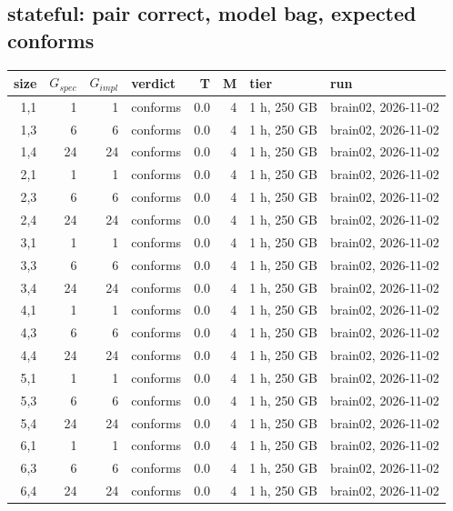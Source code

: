 \documentclass[10pt]{article}
\begin{document}
\subsection*{stateful: pair \textsf{correct}, model bag, expected conforms}
\begin{longtable}{@{}rrrlrrll@{}}
\toprule
size & $G_{\mathit{spec}}$ & $G_{\mathit{impl}}$ & verdict & T & M & tier & run \\
\midrule
\endhead
\color{blue} 1,1 & 1 & 1 & conforms & 0.0 & 4 & 1 h, 250 GB & brain02, 2026-11-02 \\
\color{blue} 1,3 & 6 & 6 & conforms & 0.0 & 4 & 1 h, 250 GB & brain02, 2026-11-02 \\
\color{blue} 1,4 & 24 & 24 & conforms & 0.0 & 4 & 1 h, 250 GB & brain02, 2026-11-02 \\
\color{blue} 2,1 & 1 & 1 & conforms & 0.0 & 4 & 1 h, 250 GB & brain02, 2026-11-02 \\
\color{blue} 2,3 & 6 & 6 & conforms & 0.0 & 4 & 1 h, 250 GB & brain02, 2026-11-02 \\
\color{blue} 2,4 & 24 & 24 & conforms & 0.0 & 4 & 1 h, 250 GB & brain02, 2026-11-02 \\
\color{blue} 3,1 & 1 & 1 & conforms & 0.0 & 4 & 1 h, 250 GB & brain02, 2026-11-02 \\
\color{blue} 3,3 & 6 & 6 & conforms & 0.0 & 4 & 1 h, 250 GB & brain02, 2026-11-02 \\
\color{blue} 3,4 & 24 & 24 & conforms & 0.0 & 4 & 1 h, 250 GB & brain02, 2026-11-02 \\
\color{blue} 4,1 & 1 & 1 & conforms & 0.0 & 4 & 1 h, 250 GB & brain02, 2026-11-02 \\
\color{blue} 4,3 & 6 & 6 & conforms & 0.0 & 4 & 1 h, 250 GB & brain02, 2026-11-02 \\
\color{blue} 4,4 & 24 & 24 & conforms & 0.0 & 4 & 1 h, 250 GB & brain02, 2026-11-02 \\
\color{blue} 5,1 & 1 & 1 & conforms & 0.0 & 4 & 1 h, 250 GB & brain02, 2026-11-02 \\
\color{blue} 5,3 & 6 & 6 & conforms & 0.0 & 4 & 1 h, 250 GB & brain02, 2026-11-02 \\
\color{blue} 5,4 & 24 & 24 & conforms & 0.0 & 4 & 1 h, 250 GB & brain02, 2026-11-02 \\
\color{blue} 6,1 & 1 & 1 & conforms & 0.0 & 4 & 1 h, 250 GB & brain02, 2026-11-02 \\
\color{blue} 6,3 & 6 & 6 & conforms & 0.0 & 4 & 1 h, 250 GB & brain02, 2026-11-02 \\
\color{blue} 6,4 & 24 & 24 & conforms & 0.0 & 4 & 1 h, 250 GB & brain02, 2026-11-02 \\

\end{longtable}
\end{document}
